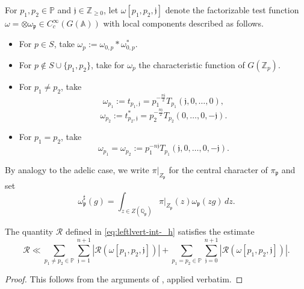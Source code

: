 \begin{notation}\label{sec:notation-pretr-ineq-mult-3}
  For $p_1, p_2 \in \mathbb{P}$ and $\mathfrak{j} \in \mathbb{Z}_{\geq 0}$, let $\omega[p_1, p_2, \mathfrak{j}]$ denote the factorizable test function $\omega = \otimes \omega_\mathfrak{p} \in C_c^\infty(G(\mathbb{A}))$ with local components described as follows.
  \begin{itemize}
  \item For $p \in S$, take $\omega_p := \omega_{0,p} \ast \omega_{0,p}^*$.
  \item For $p \notin S \cup  \{p_1, p_2\}$, take for $\omega_p$ the characteristic function of $G(\mathbb{Z}_p)$.
  \item For $p_1 \neq p_2$, take
    \begin{equation}\label{eq:omega_p_1-:=-t_p_1}
      \omega_{p_1} :=  t_{p_1,\mathfrak{j}}
      =
      p_1 ^{- \frac{n \mathfrak{j}}{2}} T_{p_1} (\mathfrak{j},0,\dotsc,0),
    \end{equation}
    \begin{equation}\label{eq:omega_p_2-:=-t_p_2}
      \omega_{p_2} :=  t_{p_2,\mathfrak{j}}^* = p_2 ^{- \frac{n \mathfrak{j}}{2}} T_{p_2} (0, \dotsc, 0, -\mathfrak{j}).
    \end{equation}
  \item For $p_1 = p_2$, take
    \begin{equation}\label{eq:omeg-=-omeg}
      \omega_{p_1} = \omega_{p_2} := p_1^{- n \mathfrak{j}} T_{p_1}(\mathfrak{j},0,\dotsc,0,-\mathfrak{j}).
    \end{equation}
  \end{itemize}
  By analogy to the adelic case, we write $\pi|_{Z_\mathfrak{p}}$ for the central character of $\pi_\mathfrak{p}$ and set
  \begin{equation}\label{eq:omeg-=-int}
    \omega_\mathfrak{p}^\sharp(g) = \int_{z \in Z(\mathbb{Q}_\mathfrak{p})} \pi|_{Z_\mathfrak{p}}(z) \omega_\mathfrak{p}(z g) \, d z.
  \end{equation}

\end{notation}
\begin{lemma}
  The quantity $\mathcal{R}$ defined in \eqref{eq:leftlvert-int-_h} satisfies the estimate
  \begin{equation}\label{eq:mathcalr-ll-sum}
    \mathcal{R} \ll \sum_{p_1 \neq p_2 \in \mathbb{P} } \sum_{\mathfrak{j}=1}^{n+1}
    \left\lvert \mathcal{R}(\omega[p_1, p_2, \mathfrak{j}]) \right\rvert
    + \sum_{p_1 = p_2 \in \mathbb{P} } \sum_{\mathfrak{j}=0}^{n+1}
    \left\lvert \mathcal{R} (\omega[p_1, p_2, \mathfrak{j}]) \right\rvert.
  \end{equation}
\end{lemma}
\begin{proof}
  This follows from the arguments of \cite[\S6.3]{2020arXiv201202187N}, applied verbatim.
\end{proof}


